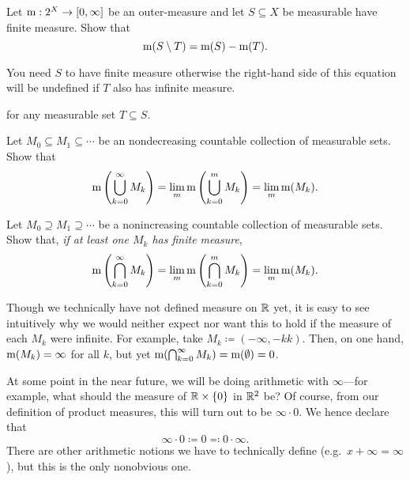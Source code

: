 \begin{exr}\label{exr5.1.21}
Let $\mathrm{m} :2^X\rightarrow [0,\infty ]$ be an outer-measure and let $S\subseteq X$ be measurable have finite measure.  Show that
\begin{equation}
\mathrm{m} (S\setminus T)=\mathrm{m} (S)-\mathrm{m} (T).
\end{equation}
\begin{rmk}
You need $S$ to have finite measure otherwise the right-hand side of this equation will be undefined if $T$ also has infinite measure.
\end{rmk}
for any measurable set $T\subseteq S$.
\end{exr}
\begin{exr}\label{exr5.1.27}
Let $M_0\subseteq M_1\subseteq \cdots$ be an nondecreasing countable collection of measurable sets.  Show that
\begin{equation}
\mathrm{m} \left( \bigcup _{k=0}^\infty M_k\right) =\lim _m\mathrm{m} \left( \bigcup _{k=0}^mM_k\right) =\lim _m\mathrm{m} (M_k).
\end{equation}
\end{exr}
\begin{exr}\label{exr5.1.29}
Let $M_0\supseteq M_1\supseteq \cdots$ be a nonincreasing countable collection of measurable sets.  Show that, \emph{if at least one $M_k$ has finite measure},
\begin{equation}
\mathrm{m} \left( \bigcap _{k=0}^\infty M_k\right) =\lim _m\mathrm{m} \left( \bigcap _{k=0}^mM_k\right) =\lim _m\mathrm{m} (M_k).
\end{equation}
\begin{rmk}
Though we technically have not defined measure on $\mathbb{R}$ yet, it is easy to see intuitively why we would neither expect nor want this to hold if the measure of each $M_k$ were infinite.  For example, take $M_k\coloneqq (-\infty ,-kk)$.  Then, on one hand, $\mathrm{m} (M_k)=\infty$ for all $k$, but yet $\mathrm{m} (\bigcap _{k=0}^\infty M_k)=\mathrm{m} (\emptyset )=0$.
\end{rmk}
\end{exr}

\begin{displayquote}
At some point in the near future, we will be doing arithmetic with $\infty$---for example, what should the measure of $\mathbb{R} \times \{ 0\}$ in $\mathbb{R} ^2$ be?  Of course, from our definition of product measures, this will turn out to be $\infty \cdot 0$.  We hence declare that
\begin{equation}
\infty \cdot 0\coloneqq 0\eqqcolon 0\cdot \infty .
\end{equation}
There are other arithmetic notions we have to technically define (e.g.~$x+\infty=\infty$), but this is the only nonobvious one.
\end{displayquote}

